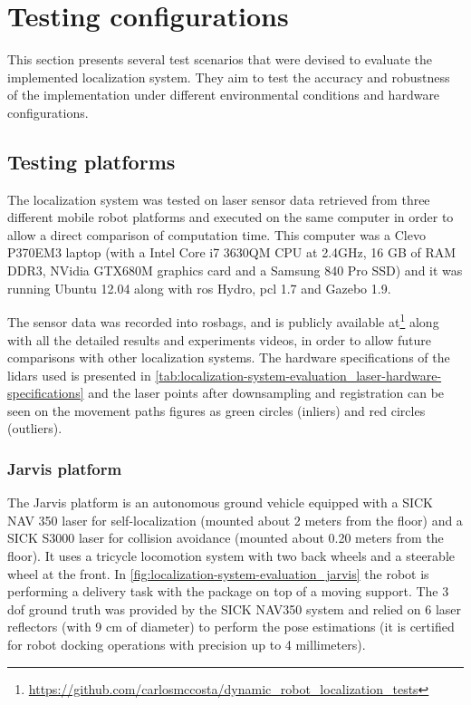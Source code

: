 \section{Testing configurations}\label{sec:testing-configurations}

This section presents several test scenarios that were devised to evaluate the implemented localization system. They aim to test the accuracy and robustness of the implementation under different environmental conditions and hardware configurations.


\subsection{Testing platforms}

The localization system was tested on laser sensor data retrieved from three different mobile robot platforms and executed on the same computer in order to allow a direct comparison of computation time. This computer was a Clevo P370EM3 laptop (with a Intel Core i7 3630QM CPU at 2.4GHz, 16 GB of RAM DDR3, NVidia GTX680M graphics card and a Samsung 840 Pro SSD) and it was running Ubuntu 12.04 along with \gls{ros} Hydro, \gls{pcl} 1.7 and Gazebo 1.9.

The sensor data was recorded into rosbags, and is publicly available at\footnote{\url{https://github.com/carlosmccosta/dynamic_robot_localization_tests}} along with all the detailed results and experiments videos, in order to allow future comparisons with other localization systems. The hardware specifications of the \glspl{lidar} used is presented in \cref{tab:localization-system-evaluation_laser-hardware-specifications} and the laser points after downsampling and registration can be seen on the movement paths figures as green circles (inliers) and red circles (outliers).


\subsubsection{Jarvis platform}

The Jarvis platform is an autonomous ground vehicle equipped with a SICK NAV 350 laser for self-localization (mounted about 2 meters from the floor) and a SICK S3000 laser for collision avoidance (mounted about 0.20 meters from the floor). It uses a tricycle locomotion system with two back wheels and a steerable wheel at the front. In \cref{fig:localization-system-evaluation_jarvis} the robot is performing a delivery task with the package on top of a moving support. The 3 \gls{dof} ground truth was provided by the SICK NAV350 system and relied on 6 laser reflectors (with 9 cm of diameter) to perform the pose estimations (it is certified for robot docking operations with precision up to 4 millimeters).

